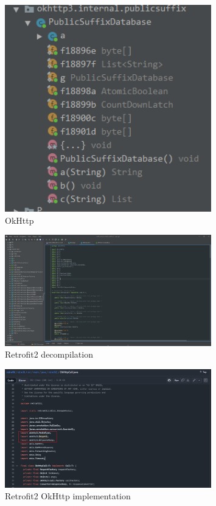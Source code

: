 \documentclass[12pt,a4paper]{article}
\begin{document}
\begin{figure}[H]
\centering
\includegraphics[width=0.8\textwidth]{./screenshots/okhttp.png}
\caption{OkHttp}
\end{figure}

\begin{figure}[H]
\centering
\includegraphics[width=0.8\textwidth]{./screenshots/retrofit_dec.png}
\caption{Retrofit2 decompilation}
\end{figure}

\begin{figure}[H]
\centering
\includegraphics[width=0.8\textwidth]{./screenshots/retrofit_okhttp.png}
\caption{Retrofit2 OkHttp implementation}
\end{figure}
\end{document}
